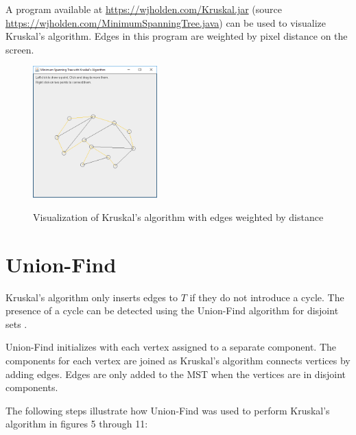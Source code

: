 \documentclass{book}
\begin{document}
A program available at \url{https://wjholden.com/Kruskal.jar} (source \url{https://wjholden.com/MinimumSpanningTree.java}) can be used to visualize Kruskal's algorithm. Edges in this program are weighted by pixel distance on the screen.

\begin{figure}[h]
\centering
\includegraphics[height=2in]{ch-spann/kruskal-app}
\label{kruskal-app}
\caption{Visualization of Kruskal's algorithm with edges weighted by distance}
\end{figure}

\section{Union-Find}
Kruskal's algorithm only inserts edges to $T$ if they do not introduce a cycle. The presence of a cycle can be detected using the Union-Find algorithm for disjoint sets \cite{cormen2001introduction}.

Union-Find initializes with each vertex assigned to a separate component. The components for each vertex are joined as Kruskal's algorithm connects vertices by adding edges. Edges are only added to the MST when the vertices are in disjoint components.

The following steps illustrate how Union-Find was used to perform Kruskal's algorithm in figures 5 through 11:
\end{document}
